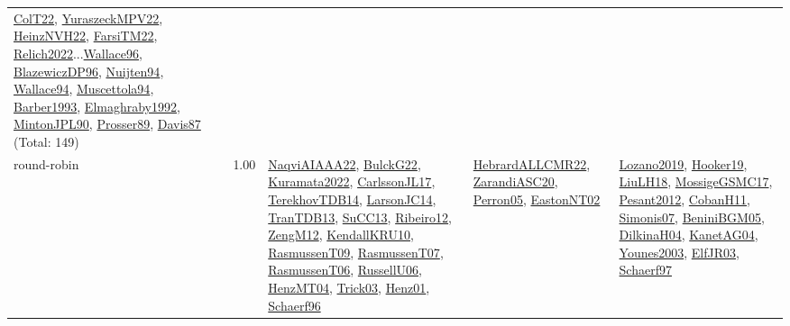 {\begin{longtable}{p{3cm}r>{\raggedright\arraybackslash}p{6cm}>{\raggedright\arraybackslash}p{6cm}>{\raggedright\arraybackslash}p{8cm}}
\hyperref[detail:ColT22]{ColT22}, \hyperref[detail:YuraszeckMPV22]{YuraszeckMPV22}, \hyperref[detail:HeinzNVH22]{HeinzNVH22}, \hyperref[detail:FarsiTM22]{FarsiTM22}, \hyperref[detail:Relich2022]{Relich2022}...\hyperref[detail:Wallace96]{Wallace96}, \hyperref[detail:BlazewiczDP96]{BlazewiczDP96}, \hyperref[detail:Nuijten94]{Nuijten94}, \hyperref[detail:Wallace94]{Wallace94}, \hyperref[detail:Muscettola94]{Muscettola94}, \hyperref[detail:Barber1993]{Barber1993}, \hyperref[detail:Elmaghraby1992]{Elmaghraby1992}, \hyperref[detail:MintonJPL90]{MintonJPL90}, \hyperref[detail:Prosser89]{Prosser89}, \hyperref[detail:Davis87]{Davis87} (Total: 149)\\
\index{round-robin}\index{ApplicationAreas!round-robin}round-robin &  1.00 & \hyperref[detail:NaqviAIAAA22]{NaqviAIAAA22}, \hyperref[detail:BulckG22]{BulckG22}, \hyperref[detail:Kuramata2022]{Kuramata2022}, \hyperref[detail:CarlssonJL17]{CarlssonJL17}, \hyperref[detail:TerekhovTDB14]{TerekhovTDB14}, \hyperref[detail:LarsonJC14]{LarsonJC14}, \hyperref[detail:TranTDB13]{TranTDB13}, \hyperref[detail:SuCC13]{SuCC13}, \hyperref[detail:Ribeiro12]{Ribeiro12}, \hyperref[detail:ZengM12]{ZengM12}, \hyperref[detail:KendallKRU10]{KendallKRU10}, \hyperref[detail:RasmussenT09]{RasmussenT09}, \hyperref[detail:RasmussenT07]{RasmussenT07}, \hyperref[detail:RasmussenT06]{RasmussenT06}, \hyperref[detail:RussellU06]{RussellU06}, \hyperref[detail:HenzMT04]{HenzMT04}, \hyperref[detail:Trick03]{Trick03}, \hyperref[detail:Henz01]{Henz01}, \hyperref[detail:Schaerf96]{Schaerf96} & \hyperref[detail:HebrardALLCMR22]{HebrardALLCMR22}, \hyperref[detail:ZarandiASC20]{ZarandiASC20}, \hyperref[detail:Perron05]{Perron05}, \hyperref[detail:EastonNT02]{EastonNT02} & \hyperref[detail:Lozano2019]{Lozano2019}, \hyperref[detail:Hooker19]{Hooker19}, \hyperref[detail:LiuLH18]{LiuLH18}, \hyperref[detail:MossigeGSMC17]{MossigeGSMC17}, \hyperref[detail:Pesant2012]{Pesant2012}, \hyperref[detail:CobanH11]{CobanH11}, \hyperref[detail:Simonis07]{Simonis07}, \hyperref[detail:BeniniBGM05]{BeniniBGM05}, \hyperref[detail:DilkinaH04]{DilkinaH04}, \hyperref[detail:KanetAG04]{KanetAG04}, \hyperref[detail:Younes2003]{Younes2003}, \hyperref[detail:ElfJR03]{ElfJR03}, \hyperref[detail:Schaerf97]{Schaerf97}\\

\end{longtable}}
